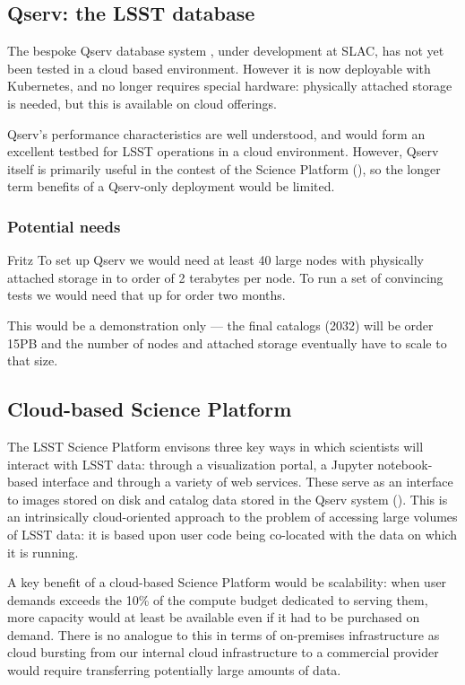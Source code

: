 \subsection{Qserv: the LSST database}\label{sect:qserv}

The bespoke Qserv database system , under development at SLAC, has not yet been tested in a cloud based environment.
However it is now deployable with Kubernetes, and no longer requires special hardware: physically attached storage is needed, but this is available on cloud offerings.

Qserv's performance characteristics are well understood, and would form an excellent testbed for LSST operations in a cloud environment.
However, Qserv itself is primarily useful in the contest of the Science Platform (), so the longer term benefits of a Qserv-only deployment would be limited.

\subsubsection{Potential needs} \label{sect:qservneeds}
{\color{red} Fritz }
To set up Qserv  we would need at least 40 large nodes with physically attached storage in to order of 2 terabytes per node.
To run a set of convincing tests we would need that up for order two months.

This would be a  demonstration only — the final catalogs (2032) will be order 15PB and the number of nodes and attached storage eventually have to scale to that size.

\subsection{Cloud-based Science Platform} \label{sect:platform}

The LSST Science Platform  envisons three key ways in which scientists will interact with LSST data: through a visualization portal, a Jupyter notebook-based interface and through a variety of web services.
These serve as an interface to images stored on disk and catalog data stored in the Qserv system ().
This is an intrinsically cloud-oriented approach to the problem of accessing large volumes of LSST data: it is based upon user code being co-located with the data on which it is running.

A key benefit of a cloud-based Science Platform would be scalability: when user demands exceeds the 10\% of the compute budget dedicated to serving them, more capacity would at least be available even if it had to be purchased on demand.
There is no analogue to this in terms of on-premises infrastructure as cloud bursting from our internal cloud infrastructure to a commercial provider would require transferring potentially large amounts of data.

